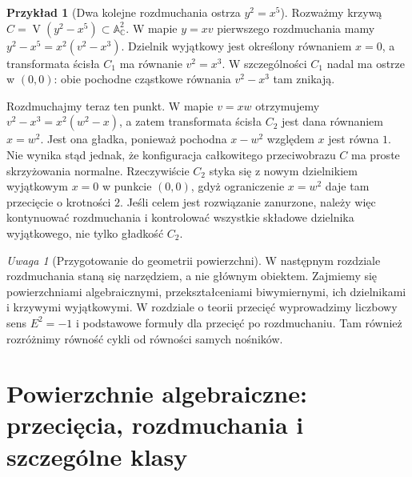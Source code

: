 \documentclass[11pt,a4paper,openany]{report}
\numberwithin{equation}{section}
\theoremstyle{plain}
\theoremstyle{definition}
\newtheorem{przyklad}[twierdzenie]{Przykład}
\theoremstyle{remark}
\newtheorem{uwaga}[twierdzenie]{Uwaga}
\newcommand{\C}{\mathbb C}
\newcommand{\A}{\mathbb A}
\newcommand{\V}{\operatorname V}
\begin{document}
\begin{przyklad}[Dwa kolejne rozdmuchania ostrza $y^2=x^5$]
Rozważmy krzywą $C=\V(y^2-x^5)\subset\A^2_{\C}$.
W mapie $y=xv$ pierwszego rozdmuchania mamy
$y^2-x^5=x^2(v^2-x^3)$. Dzielnik wyjątkowy jest
określony równaniem $x=0$, a transformata ścisła
$C_1$ ma równanie $v^2=x^3$. W szczególności
$C_1$ nadal ma ostrze w $(0,0)$: obie pochodne
cząstkowe równania $v^2-x^3$ tam znikają.

Rozdmuchajmy teraz ten punkt. W mapie $v=xw$
otrzymujemy $v^2-x^3=x^2(w^2-x)$, a zatem
transformata ścisła $C_2$ jest dana równaniem
$x=w^2$. Jest ona gładka, ponieważ pochodna
$x-w^2$ względem $x$ jest równa $1$.
Nie wynika stąd jednak, że konfiguracja całkowitego
przeciwobrazu $C$ ma proste skrzyżowania normalne.
Rzeczywiście $C_2$ styka się z nowym dzielnikiem
wyjątkowym $x=0$ w punkcie $(0,0)$, gdyż ograniczenie
$x=w^2$ daje tam przecięcie o krotności $2$.
Jeśli celem jest rozwiązanie zanurzone, należy więc
kontynuować rozdmuchania i kontrolować wszystkie
składowe dzielnika wyjątkowego, nie tylko gładkość $C_2$.
\end{przyklad}

\begin{uwaga}[Przygotowanie do geometrii powierzchni]
W następnym rozdziale rozdmuchania staną się
narzędziem, a nie głównym obiektem. Zajmiemy się
powierzchniami algebraicznymi, przekształceniami
biwymiernymi, ich dzielnikami i krzywymi wyjątkowymi.
W rozdziale o teorii przecięć wyprowadzimy
liczbowy sens $E^2=-1$ i podstawowe formuły
dla przecięć po rozdmuchaniu. Tam również rozróżnimy
równość cykli od równości samych nośników.
\end{uwaga}




\chapter{Powierzchnie algebraiczne: przecięcia, rozdmuchania i szczególne klasy}
\label{ch:ga6-powierzchnie}
\end{document}
